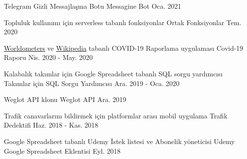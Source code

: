 

\begin{cventries}

  \cventry
    {Telegram Gizli Messajlaşma Botu} %
    {Messagine Bot} %
    {} %
    {Oca. 2021} %
    {}

  \cventry
    {Topluluk kullanımı için serverless tabanlı fonksiyonlar} %
    {Ortak Fonksiyonlar} %
    {} %
    {Tem. 2020} %
    {}

  \cventry
    {\href{https://www.worldometers.info/coronavirus}{Worldometers} ve \href{https://en.wikipedia.org/wiki/COVID-19_pandemic}{Wikipedia} tabanlı COVID-19 Raporlama uygulaması} %
    {Covid-19 Raporu} %
    {} %
    {Nis. 2020 - May. 2020} %
    {}

  \cventry
    {Kalabalık takımlar için Google Spreadsheet tabanlı SQL sorgu yardımcısı} %
    {Takımlar için SQL Sorgu Yardımcısı} %
    {} %
    {Ara. 2019 - Oca. 2020} %
    {}

  \cventry
    {Weglot API klonu} %
    {Weglot API} %
    {} %
    {Ara. 2019} %
    {}

  \cventry
    {Trafik canavarlarını bildirmek için platformlar arası mobil uygulama} %
    {Trafik Dedektifi} %
    {} %
    {Haz. 2018 - Kas. 2018} %
    {}

  \cventry
    {Google Spreadsheet tabanlı Udemy İstek listesi ve Abonelik yöneticisi} %
    {Udemy Google Spreadsheet Eklentisi} %
    {} %
    {Eyl. 2018} %
    {}


\end{cventries}
